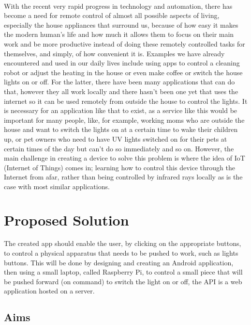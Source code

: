 \documentclass[12pt, oneside, a4paper]{book}
\begin{document}
		\paragraph{}With the recent very rapid progress in technology and automation, there has become a need for remote control of almost all possible aspects of living, especially the house appliances that surround us, because of how easy it makes the modern human’s life and how much it allows them to focus on their main work and be more productive instead of doing these remotely controlled tasks for themselves, and simply, of how convenient it is. Examples we have already encountered and used in our daily lives include using apps to control a cleaning robot or adjust the heating in the house or even make coffee or switch the house lights on or off. For the latter, there have been many applications that can do that, however they all work locally and there hasn’t been one yet that uses the internet so it can be used remotely from outside the house to control the lights. It is necessary for an application like that to exist, as a service like this would be important for many people, like, for example, working moms who are outside the house and want to switch the lights on at a certain time to wake their children up, or pet owners who need to have UV lights switched on for their pets at certain times of the day but can’t do so immediately and so on. However, the main challenge in creating a device to solve this problem is where the idea of IoT (Internet of Things) comes in; learning how to control this device through the Internet from afar, rather than being controlled by infrared rays locally as is the case with most similar applications.
		\section{Proposed Solution}
		\paragraph{}The created app should enable the user, by clicking on the appropriate buttons, to control a physical apparatus that needs to be pushed to work, such as lights buttons. This will be done by designing and creating an Android application, then using a small laptop, called Raspberry Pi, to control a small piece that will be pushed forward (on command) to switch the light on or off, the API is a web application hosted on a server.
		
		\subsection{Aims}
\end{document}

